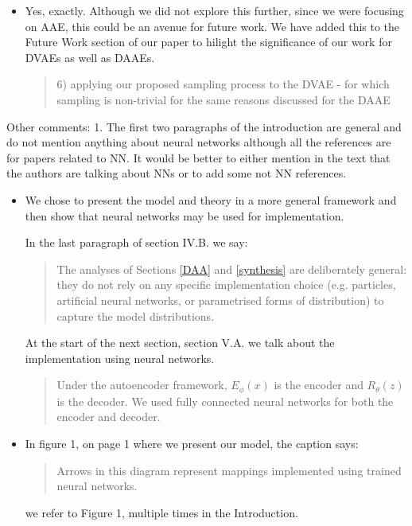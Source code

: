 \documentclass{article}
\begin{document}
\begin{itemize}
    \item Yes, exactly. Although we did not explore this further, since we were focusing on AAE, this could be an avenue for future work. We have added this to the Future Work section of our paper to hilight the significance of our work for DVAEs as well as DAAEs.
    \begin{quote}
        6) applying our proposed sampling process to the DVAE \cite{im2015denoising} - for which sampling is non-trivial for the same reasons discussed for the DAAE
    \end{quote}
\end{itemize}


Other comments: \newline
{\color{blue}
1. The first two paragraphs of the introduction are general and do not mention anything about neural networks although all the references are for papers related to NN. It would be better to either mention in the text that the authors are talking about NNs or to add some not NN references.}

\begin{itemize}
    \item We chose to present the model and theory in a more general framework and then show that neural networks may be used for implementation.
    
    In the last paragraph of section IV.B. we say:
    \begin{quote}
    The analyses of Sections \ref{DAA} and \ref{synthesis} are deliberately general: they do not rely on any specific implementation choice (e.g. particles, artificial neural networks, or parametrised forms of distribution) to capture the model distributions.
    \end{quote}
At the start of the next section, section V.A. we talk about the implementation using neural networks.
\begin{quote}
    Under the autoencoder framework, $E_\phi(x)$ is the encoder and $R_\theta(z)$ is the decoder. We used fully connected neural networks for both the encoder and decoder.
\end{quote}

\item In figure 1, on page 1 where we present our model, the caption says:
\begin{quote}
    Arrows in this diagram represent mappings implemented using trained neural networks.
\end{quote}
we refer to Figure 1, multiple times in the Introduction.

\end{itemize}
\end{document}
